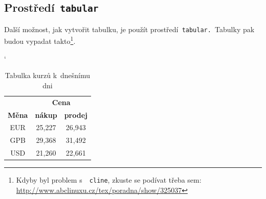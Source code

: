 \documentclass[11pt,a4paper]{article}
\begin{document}
\subsection{Prostředí\texttt{ tabular}}
Další možnost, jak vytvořit tabulku, je použít prostředí\texttt{ tabular. }Tabulky pak budou vypadat takto\footnote{Kdyby byl problem s~\texttt{ cline}, zkuste se podívat třeba sem: \href{http://www.abclinuxu.cz/tex/poradna/show/325037}{http://www.abclinuxu.cz/tex/poradna/show/325037}}.
\bigbreak
\begin{table}[h]
\begin{center}
\catcode`

\begin{tabular}{|c|c|c|}
\hline
     & \multicolumn{2}{c|}{\textbf{Cena}}\\\cline{2-3}
    \textbf{Měna} & \textbf{nákup} & \textbf{prodej}  \\
\hline
    EUR & 25,227 & 26,943 \\
    GPB & 29,368 & 31,492 \\
    USD & 21,260 & 22,661 \\
\hline
\end{tabular}
\caption{\label{tab:tab1}Tabulka kurzů k~dnešnímu dni}
\end{center}
\end{table}
\end{document}

